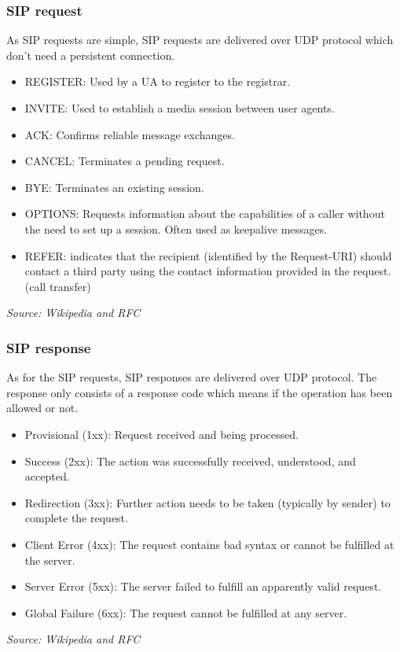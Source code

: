 \subsubsection{SIP request}
As SIP requests are simple, SIP requests are delivered over UDP protocol which don't need a persistent connection.  

\begin{itemize}
\item REGISTER: Used by a UA to register to the registrar.
\item INVITE: Used to establish a media session between user agents.
\item ACK: Confirms reliable message exchanges.
\item CANCEL: Terminates a pending request.
\item BYE: Terminates an existing session.
\item OPTIONS: Requests information about the capabilities of a caller without the need to set up a session. Often used as keepalive messages.
\item REFER: indicates that the recipient (identified by the Request-URI) should contact a third party using the contact information provided in the request. (call transfer)
\end{itemize}
\textit{\small{Source: Wikipedia and RFC}}


\subsubsection{SIP response}
As for the SIP requests, SIP responses are delivered over UDP protocol. The response only consists of a response code which means if the operation has been allowed or not. 

\begin{itemize}
\item Provisional (1xx): Request received and being processed.
\item Success (2xx): The action was successfully received, understood, and accepted.
\item Redirection (3xx): Further action needs to be taken (typically by sender) to complete the request.
\item Client Error (4xx): The request contains bad syntax or cannot be fulfilled at the server.
\item Server Error (5xx): The server failed to fulfill an apparently valid request.
\item Global Failure (6xx): The request cannot be fulfilled at any server.
\end{itemize}
\textit{\small{Source: Wikipedia and RFC}}




